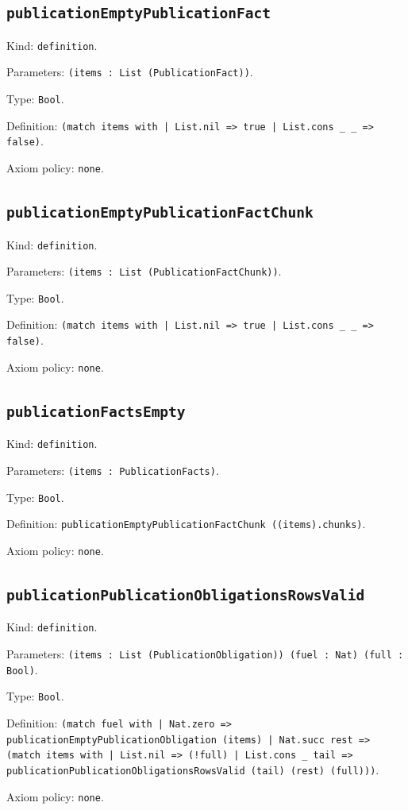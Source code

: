 \documentclass[11pt]{article}
\begin{document}
\subsection*{\texttt{publicationEmptyPublicationFact}}
\noindent Kind: \texttt{definition}.\par
\noindent Parameters: \texttt{(items : List (PublicationFact))}.\par
\noindent Type: \texttt{Bool}.\par
\noindent Definition: \texttt{(match items with | List.nil => true | List.cons \_ \_ => false)}.\par
\noindent Axiom policy: \texttt{none}.\par
\subsection*{\texttt{publicationEmptyPublicationFactChunk}}
\noindent Kind: \texttt{definition}.\par
\noindent Parameters: \texttt{(items : List (PublicationFactChunk))}.\par
\noindent Type: \texttt{Bool}.\par
\noindent Definition: \texttt{(match items with | List.nil => true | List.cons \_ \_ => false)}.\par
\noindent Axiom policy: \texttt{none}.\par
\subsection*{\texttt{publicationFactsEmpty}}
\noindent Kind: \texttt{definition}.\par
\noindent Parameters: \texttt{(items : PublicationFacts)}.\par
\noindent Type: \texttt{Bool}.\par
\noindent Definition: \texttt{publicationEmptyPublicationFactChunk ((items).chunks)}.\par
\noindent Axiom policy: \texttt{none}.\par
\subsection*{\texttt{publicationPublicationObligationsRowsValid}}
\noindent Kind: \texttt{definition}.\par
\noindent Parameters: \texttt{(items : List (PublicationObligation)) (fuel : Nat) (full : Bool)}.\par
\noindent Type: \texttt{Bool}.\par
\noindent Definition: \texttt{(match fuel with | Nat.zero => publicationEmptyPublicationObligation (items) | Nat.succ rest => (match items with | List.nil => (!full) | List.cons \_ tail => publicationPublicationObligationsRowsValid (tail) (rest) (full)))}.\par
\noindent Axiom policy: \texttt{none}.\par
\end{document}
